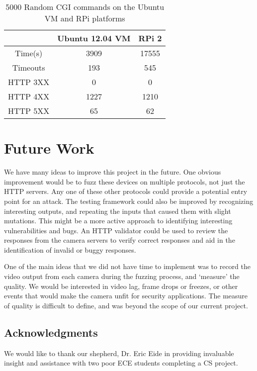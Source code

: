 \documentclass[letterpaper,twocolumn,10pt]{article}
\begin{document}
\begin{table}[here]
\centering
	\begin{tabular}{ |c|c|c| }
		\hline
		~ & Ubuntu 12.04 VM & RPi 2\\
		\hline
		\hline
		Time(s) & 3909 & 17555 \\
		Timeouts & 193 & 545  \\
		HTTP 3XX & 0 & 0 \\
		HTTP 4XX & 1227 & 1210 \\
		HTTP 5XX & 65 & 62 \\
		\hline
	\end{tabular}
	\caption{5000 Random CGI commands on the Ubuntu VM and RPi platforms}
	\label{tab:VMvsPi} 
\end{table}

\section{Future Work}
We have many ideas to improve this project in the future. One obvious improvement would be to fuzz these devices on multiple protocols, not just the HTTP servers. Any one of these other protocols could provide a potential entry point for an attack. The testing framework could also be improved by recognizing interesting outputs, and repeating the inputs that caused them with slight mutations. This might be a more active approach to identifying interesting vulnerabilities and bugs. An HTTP validator could be used to review the responses from the camera servers to verify correct responses and aid in the identification of invalid or buggy responses. 

One of the main ideas that we did not have time to implement was to record the video output from each camera during the fuzzing process, and `measure' the quality. We would be interested in video lag, frame drops or freezes, or other events that would make the camera unfit for security applications. The measure of quality is difficult to define, and was beyond the scope of our current project. 





\subsection*{Acknowledgments}
We would like to thank our shepherd, Dr. Eric Eide in providing invaluable insight and assistance with two poor ECE students completing a CS project.

{\footnotesize 
}
\end{document}
